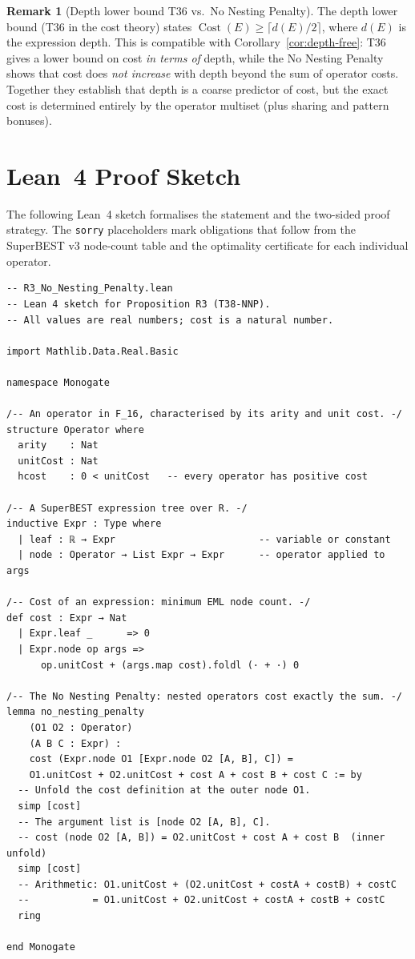 \documentclass[12pt,a4paper]{article}
\theoremstyle{definition}
\newtheorem{remark}[theorem]{Remark}
\newcommand{\Cost}{\operatorname{Cost}}
\begin{document}
\begin{remark}[Depth lower bound T36 vs.\ No Nesting Penalty]
The depth lower bound (T36 in the cost theory) states $\Cost(E) \geq
\lceil d(E)/2 \rceil$, where $d(E)$ is the expression depth.  This is
compatible with Corollary~\ref{cor:depth-free}: T36 gives a lower bound
on cost \emph{in terms of} depth, while the No Nesting Penalty shows that
cost does \emph{not increase} with depth beyond the sum of operator costs.
Together they establish that depth is a coarse predictor of cost, but the
exact cost is determined entirely by the operator multiset (plus sharing
and pattern bonuses).
\end{remark}

\section{Lean~4 Proof Sketch}
\label{sec:lean}

The following Lean~4 sketch formalises the statement and the two-sided
proof strategy.  The \texttt{sorry} placeholders mark obligations that
follow from the SuperBEST v3 node-count table and the optimality
certificate for each individual operator.

\begin{verbatim}
-- R3_No_Nesting_Penalty.lean
-- Lean 4 sketch for Proposition R3 (T38-NNP).
-- All values are real numbers; cost is a natural number.

import Mathlib.Data.Real.Basic

namespace Monogate

/-- An operator in F_16, characterised by its arity and unit cost. -/
structure Operator where
  arity    : Nat
  unitCost : Nat
  hcost    : 0 < unitCost   -- every operator has positive cost

/-- A SuperBEST expression tree over R. -/
inductive Expr : Type where
  | leaf : ℝ → Expr                         -- variable or constant
  | node : Operator → List Expr → Expr      -- operator applied to args

/-- Cost of an expression: minimum EML node count. -/
def cost : Expr → Nat
  | Expr.leaf _      => 0
  | Expr.node op args =>
      op.unitCost + (args.map cost).foldl (· + ·) 0

/-- The No Nesting Penalty: nested operators cost exactly the sum. -/
lemma no_nesting_penalty
    (O1 O2 : Operator)
    (A B C : Expr) :
    cost (Expr.node O1 [Expr.node O2 [A, B], C]) =
    O1.unitCost + O2.unitCost + cost A + cost B + cost C := by
  -- Unfold the cost definition at the outer node O1.
  simp [cost]
  -- The argument list is [node O2 [A, B], C].
  -- cost (node O2 [A, B]) = O2.unitCost + cost A + cost B  (inner unfold)
  simp [cost]
  -- Arithmetic: O1.unitCost + (O2.unitCost + costA + costB) + costC
  --           = O1.unitCost + O2.unitCost + costA + costB + costC
  ring

end Monogate
\end{verbatim}
\end{document}

